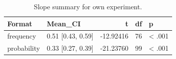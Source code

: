 \begin{table}
\centering
\caption{Slope summary for own experiment.}
\centering
\fontsize{10}{12}\selectfont
\begin{tabular}[t]{llrrl}
\toprule
Format & Mean\_CI & t & df & p\\
\midrule
frequency & 0.51 [0.43, 0.59] & -12.92416 & 76 & < .001\\
probability & 0.33 [0.27, 0.39] & -21.23760 & 99 & < .001\\
\bottomrule
\end{tabular}
\end{table}
